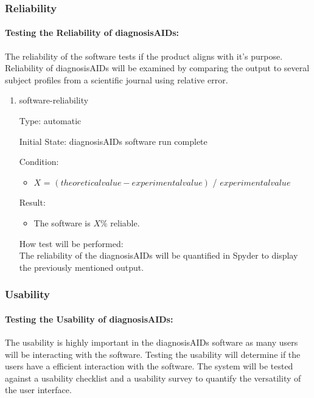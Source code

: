 \documentclass[12pt, titlepage]{article}
\begin{document}
\begin{enumerate}
\subsubsection{Reliability}
\paragraph{Testing the Reliability of diagnosisAIDs:}
The reliability of the software tests if the product aligns with it's purpose. 
Reliability of diagnosisAIDs will be examined by comparing the output to several 
subject profiles from a scientific journal using relative error.
\begin{enumerate}

\item{software-reliability\\}

Type: automatic
					
Initial State: diagnosisAIDs software run complete
					
Condition:
\begin{itemize} %
\item $X$ = $(theoretical value - experimental value)$ / $experimental value$
\end{itemize}

Result: 
\begin{itemize}
\item The software is $X\%$ reliable.
\end{itemize}
				
					
How test will be performed: \\
The reliability of the diagnosisAIDs will be quantified in Spyder to display the 
previously mentioned output. \\

\end{enumerate}

\subsubsection{Usability}

\paragraph{Testing the Usability of diagnosisAIDs:}

The usability is highly important in the diagnosisAIDs software as many users 
will be interacting with the software. Testing the usability will determine if 
the users have a efficient interaction with the software. The system will be 
tested against a usability checklist and a usability survey to quantify the 
versatility of the user interface.



\end{enumerate}
\end{document}
